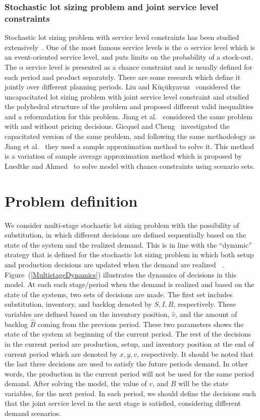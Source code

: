 \documentclass[10pt]{article}
\newcommand{\Bi}{B} %
\newcommand{\Vi}{v} %
\newcommand{\Es}{S} %
\begin{document}
\subsubsection{Stochastic lot sizing problem and joint service level constraints}
Stochastic lot sizing problem with service level constraints has been studied extensively~\cite{tempelmeier2007stochastic}. One of the most famous service levels is the $\alpha$ service level which is an event-oriented service level, and puts limits on the probability of a stock-out. The $\alpha$ service level is presented as a chance constraint and is usually defined for each period and product separately. There are some research which define it jointly over different planning periods. Liu and K{\"u}{\c{c}}{\"u}kyavuz~\cite{liu2018polyhedral} considered the uncapacitated lot sizing problem with joint service level constraint and studied the polyhedral structure of the problem and proposed different valid inequalities and a reformulation for this problem. Jiang et al.~\cite{jiang2017production} considered the same problem with and without pricing decisions. Gicquel and Cheng~\cite{gicquel2018joint} investigated the capacitated version of the same problem, and following the same methodology as Jiang et al.~\cite{jiang2017production} they used a sample approximation method to solve it. This method is a variation of sample average approximation method which is proposed by Luedtke and Ahmed~\cite{luedtke2008sample} to solve model with chance constraints using scenario sets.


\section{Problem definition}
We consider multi-stage stochastic lot sizing problem with the possibility of substitution, in which different decisions are defined sequentially based on the state of the system and the realized demand. This is in line with the  ``dynamic'' strategy that is defined for the stochastic lot sizing problem in which both setup and production decisions are updated when the demand are realized ~\cite{bookbinder1988strategies}. Figure~(\ref{MultistageDynamics}) illustrates the dynamics of decisions  in this model. At each each stage/period when the demand is realized and based on the state of the systems, two sets of decisions are made. The first set includes substitution, inventory, and backlog denoted by $\Es, I, \Bi$, respectively. These variables are defined based on the inventory position, $\hat{\Vi}$, and the amount of backlog $\hat{\Bi}$ coming from the previous period. These two parameters shows the state of the system at beginning of the current period. The rest of the decisions in the current period are production, setup, and inventory position at the end of current period which are denoted by $x, y, v$, respectively.  It should be noted that the last three decisions are used to satisfy the future periods demand. In other words, the production in the current period will not be used for the same period demand. After solving the model, the value of $\Vi$, and $\Bi$ will be the state variables, for the next period. In each period, we should define the decisions such that the joint service level in the next stage is satisfied, considering different demand scenarios. 
\end{document}
